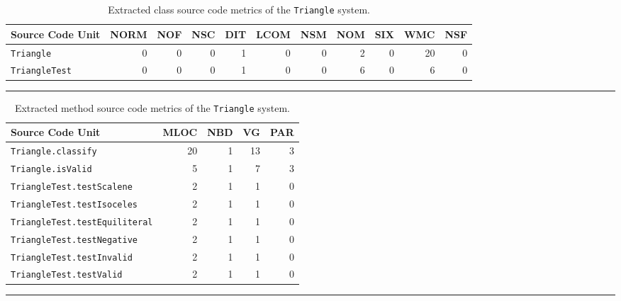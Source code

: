 \begin{landscape}
  \begin{table}[h]
    \centering
    \begin{tabular}{|l|r|r|r|r|r|r|r|r|r|r|}
      \hline
      \rowcolor[RGB]{169,196,223}
      \textbf{Source Code Unit} & \textbf{NORM} & \textbf{NOF} & \textbf{NSC} & \textbf{DIT} & \textbf{LCOM} & \textbf{NSM} & \textbf{NOM} & \textbf{SIX} & \textbf{WMC} & \textbf{NSF} \\
      \hline \texttt{Triangle} & 0 & 0 & 0 & 1 & 0 & 0 & 2 & 0 & 20 & 0 \\
      \hline \texttt{TriangleTest} & 0 & 0 & 0 & 1 & 0 & 0 & 6 & 0 & 6 & 0 \\
      \hline
    \end{tabular}
    \caption{Extracted class source code metrics of the \texttt{Triangle} system.}
    \label{tab:triangle_class_extracted_metrics}
    \vspace{2mm}
    \hrule
  \end{table}

  \begin{table}[h]
    \centering
    \begin{tabular}{|l|r|r|r|r|}
      \hline
      \rowcolor[RGB]{169,196,223}
      \textbf{Source Code Unit} & \textbf{MLOC} & \textbf{NBD} & \textbf{VG} & \textbf{PAR} \\
      \hline \texttt{Triangle.classify} & 20 & 1 & 13 & 3 \\
      \hline \texttt{Triangle.isValid} & 5 & 1 & 7 & 3 \\
      \hline \texttt{TriangleTest.testScalene} & 2 & 1 & 1 & 0 \\
      \hline \texttt{TriangleTest.testIsoceles} & 2 & 1 & 1 & 0 \\
      \hline \texttt{TriangleTest.testEquiliteral} & 2 & 1 & 1 & 0 \\
      \hline \texttt{TriangleTest.testNegative} & 2 & 1 & 1 & 0 \\
      \hline \texttt{TriangleTest.testInvalid} & 2 & 1 & 1 & 0 \\
      \hline \texttt{TriangleTest.testValid} & 2 & 1 & 1 & 0 \\
      \hline
    \end{tabular}
    \caption{Extracted method source code metrics of the \texttt{Triangle} system.}
    \label{tab:triangle_method_extracted_metrics}
    \vspace{2mm}
    \hrule
  \end{table}
\end{landscape}


